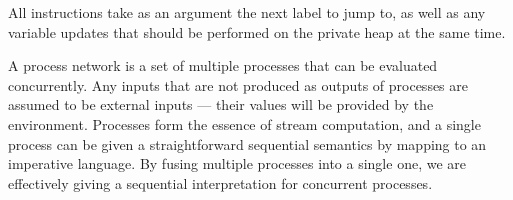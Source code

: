 All instructions take as an argument the next label to jump to, as well as any variable updates that should be performed on the private heap at the same time.

A process network is a set of multiple processes that can be evaluated concurrently.
Any inputs that are not produced as outputs of processes are assumed to be external inputs --- their values will be provided by the environment.
Processes form the essence of stream computation, and a single process can be given a straightforward sequential semantics by mapping to an imperative language.
By fusing multiple processes into a single one, we are effectively giving a sequential interpretation for concurrent processes.


% 
% 
% 
% 
% 
